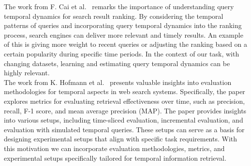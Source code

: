 The work from F. Cai et al.~\cite{cai2014learning} remarks the importance of understanding query temporal dynamics for
search result ranking.
By considering the temporal patterns of queries and incorporating query temporal dynamics into the ranking process,
search engines can deliver more relevant and timely results.
An example of this is giving more weight to recent queries or adjusting the ranking based on a certain popularity during
specific time periods.
In the context of our task, with changing datasets, learning and estimating query temporal dynamics can be highly
relevant.\\

The work from K. Hofmann et al.~\cite{hofmann2014evaluating} presents valuable insights into evaluation methodologies for
temporal aspects in web search systems.
Specifically, the paper explores metrics for evaluating retrieval effectiveness over time, such as precision, recall,
F-1 score, and mean average precision (MAP).
The paper provides insights into various setups, including time-sliced evaluation, incremental evaluation, and
evaluation with simulated temporal queries.
These setups can serve as a basis for designing experimental setups that align with specific task requirements.
With this motivation we can incorporate evaluation methodologies, metrics, and experimental setups specifically tailored
for temporal information retrieval.\\

